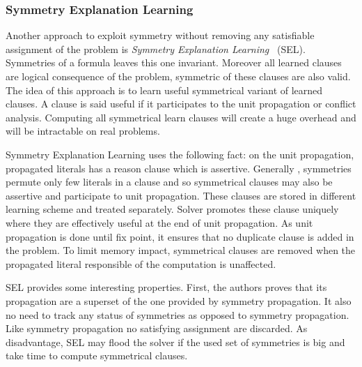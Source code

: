 \subsubsection{Symmetry Explanation Learning}


Another approach to exploit symmetry without removing any satisfiable assignment of the problem
is \emph{Symmetry Explanation Learning}~\cite{devriendt2017symmetric} (SEL). 
Symmetries of a formula leaves this one invariant. Moreover all learned clauses are logical consequence of the problem, symmetric of these clauses are also valid.
The idea of this approach is to learn useful symmetrical variant of learned clauses.
 A clause is said useful if it participates to the unit propagation or conflict analysis.
Computing all symmetrical learn clauses will create a huge overhead and will be intractable 
on real problems.

Symmetry Explanation Learning uses the following fact:
on the unit propagation, propagated literals has a reason clause which is assertive.
Generally , symmetries permute only few literals in a clause and so symmetrical clauses may
also be assertive and participate to unit propagation.
 These clauses are stored in different learning scheme and 
treated separately. Solver promotes these clause  uniquely where they are effectively useful
at the end of unit propagation. As unit propagation is done until fix point, it
ensures that no duplicate clause is added in the problem.
To limit memory impact, symmetrical clauses are removed when the propagated literal 
responsible of the computation is unaffected.

SEL provides some interesting properties. First, the authors proves that its propagation are a superset of the one provided by symmetry propagation. It also no need to track any status of 
symmetries as opposed to symmetry propagation. Like symmetry propagation no satisfying assignment are discarded.
As disadvantage, SEL may flood the solver if the used set of symmetries is big and take time 
to compute symmetrical clauses. 





